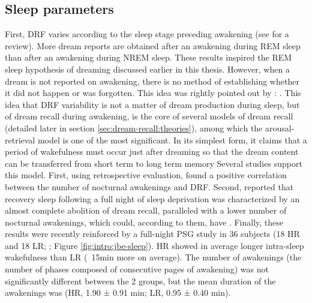 \subsection{Sleep parameters}
\label{sec:dream-recall:param:sleep}

First, DRF varies according to the sleep stage preceding awakening (see \citealp{nielsen_review_2000} for a review). More dream reports are obtained after an awakening during REM sleep than after an awakening during NREM sleep. These results inspired the REM sleep hypothesis of dreaming discussed earlier in this thesis. However, when a dream is not reported on awakening, there is no method of establishing whether it did not happen or was forgotten. This idea was rightly pointed out by \citet{conduit_poor_2004}: .
This idea that DRF variability is not a matter of dream production during sleep, but of dream recall during awakening, is the core of several models of dream recall (detailed later in section \ref{sec:dream-recall:theories}), among which the arousal-retrieval model is one of the most significant. In its simplest form, it claims that a period of wakefulness must occur just after dreaming so that the dream content can be transferred from short term to long term memory \citep{koulack_dream_1976}
Several studies support this model. First, using retrospective evaluation, \citet{schredl_factors_2003} found a positive correlation between the number of nocturnal awakenings and DRF. Second, \citet{de_gennaro_recovery_2010} reported that recovery sleep following a full night of sleep deprivation was characterized by an almost complete abolition of dream recall, paralleled with a lower number of nocturnal awakenings, which could, according to them, have . Finally, these results were recently reinforced by a full-night PSG study in 36 subjects (18 HR and 18 LR; \citealp{eichenlaub_brain_2014}; Figure \ref{fig:intro:jbe-sleep}). HR showed in average longer intra-sleep wakefulness than LR (~15min more on average). The number of awakenings (the number of phases composed of consecutive pages of awakening) was not significantly different between the 2 groups, but the mean duration of the awakenings was (HR, 1.90 ± 0.91 min; LR, 0.95 ± 0.40 min).

